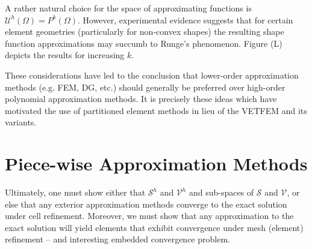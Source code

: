 	A rather natural choice for the space of approximating functions is $\mathcal{U}^h (\Omega) = P^{k} (\Omega)$. However, experimental evidence suggests that for certain element geometries (particularly for non-convex shapes) the resulting shape function approximations may succumb to Runge's phenomenon. Figure (L) depicts the results for increasing $k$.
	
	These considerations have led to the conclusion that lower-order approximation methods (e.g. FEM, DG, etc.) should generally be preferred over high-order polynomial approximation methods. It is precisely these ideas which have motivated the use of partitioned element methods in lieu of the VETFEM and its variants.
	
\section{Piece-wise Approximation Methods}
	
	Ultimately, one must show either that $\mathcal{S}^h$ and $\mathcal{V}^h$ and sub-spaces of $\mathcal{S}$ and $\mathcal{V}$, or else that any exterior approximation methods converge to the exact solution under cell refinement. Moreover, we must show that any approximation to the exact solution will yield elements that exhibit convergence under mesh (element) refinement -- and interesting embedded convergence problem.
		
			
